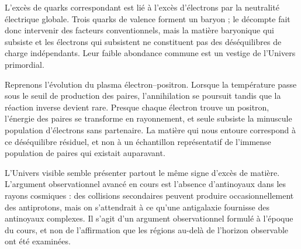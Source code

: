 L’excès de quarks correspondant est lié à l’excès d’électrons par la neutralité électrique globale. Trois quarks de valence forment un baryon ; le décompte fait donc intervenir des facteurs conventionnels, mais la matière baryonique qui subsiste et les électrons qui subsistent ne constituent pas des déséquilibres de charge indépendants. Leur faible abondance commune est un vestige de l’Univers primordial.

Reprenons l’évolution du plasma électron--positron. Lorsque la température passe sous le seuil de production des paires, l’annihilation se poursuit tandis que la réaction inverse devient rare. Presque chaque électron trouve un positron, l’énergie des paires se transforme en rayonnement, et seule subsiste la minuscule population d’électrons sans partenaire. La matière qui nous entoure correspond à ce déséquilibre résiduel, et non à un échantillon représentatif de l’immense population de paires qui existait auparavant.

\begin{classroomqa}
\end{classroomqa}

L’Univers visible semble présenter partout le même signe d’excès de matière. L’argument observationnel avancé en cours est l’absence d’antinoyaux dans les rayons cosmiques : des collisions secondaires peuvent produire occasionnellement des antiprotons, mais on s’attendrait à ce qu’une antigalaxie fournisse des antinoyaux complexes. Il s’agit d’un argument observationnel formulé à l’époque du cours, et non de l’affirmation que les régions au-delà de l’horizon observable ont été examinées.

\begin{classroomqa}
\end{classroomqa}

